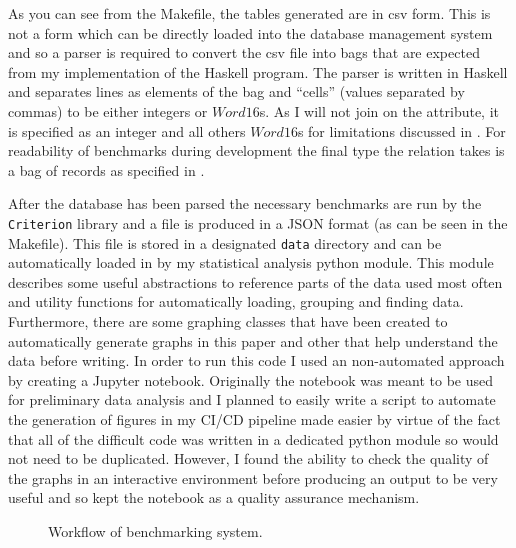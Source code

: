 As you can see from the Makefile, the tables generated are in csv form. This is
not a form which can be directly loaded into the database management system and
so a parser is required to convert the csv file into bags that are expected from
my implementation of the Haskell program. The parser is written in Haskell and
separates lines as elements of the bag and ``cells'' (values separated by
commas) to be either integers or $Word16$s. As I will not join on the
 attribute, it is specified as an integer and all
others $Word16$s for limitations discussed in . For
readability of benchmarks during development the final type the
 relation takes is a bag of records as specified in
.

After the database has been parsed the necessary benchmarks are run by the
\verb|Criterion| library and a file is produced in a JSON format (as can be seen
in the Makefile). This file is stored in a designated \verb|data| directory and
can be automatically loaded in by my statistical analysis python module. This
module describes some useful abstractions to reference parts of the data used
most often and utility functions for automatically loading, grouping and finding
data. Furthermore, there are some graphing classes that have been created to
automatically generate graphs in this paper and other that help understand the
data before writing. In order to run this code I used an non-automated approach
by creating a Jupyter notebook. Originally the notebook was meant to be used for
preliminary data analysis and I planned to easily write a script to automate the
generation of figures in my CI/CD pipeline made easier by virtue of the fact that 
all of the difficult code was written in a dedicated python module so would not
need to be duplicated. However, I found the ability to check the quality of the
graphs in an interactive environment before producing an output to be very
useful and so kept the notebook as a quality assurance mechanism.

\begin{figure}[h]
    \centering
    \caption{Workflow of benchmarking system.}
    \label{fig:benchmark:workflow}
\end{figure}

